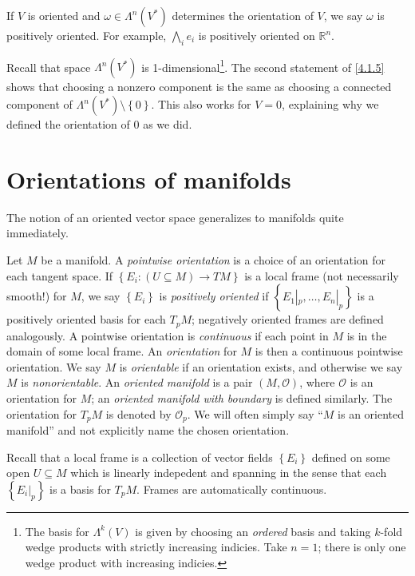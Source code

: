 If $V$ is oriented and $\omega \in \Lambda ^n(V^*)$ determines the orientation of $V$, we say $\omega $ is positively oriented. For example, $\bigwedge_i e_i$ is positively oriented on $\mathbb{R} ^n$.

Recall that space $\Lambda ^n(V^*)$ is 1-dimensional\footnote{The basis for $\Lambda ^k(V)$ is given by choosing an \emph{ordered} basis and taking $k$-fold wedge products with strictly increasing indicies. Take $n=1$; there is only one wedge product with increasing indicies.}. The second statement of \cref{4.1.5} shows that choosing a nonzero component is the same as choosing a connected component of $\Lambda ^n(V^*)\setminus \left\{ 0 \right\} $. This also works for $V=0$, explaining why we defined the orientation of 0 as we did.

\section{Orientations of manifolds}

The notion of an oriented vector space generalizes to manifolds quite immediately.

\begin{definition}\label{4.2.1}
	Let $M$ be a manifold. A \emph{pointwise orientation} is a choice of an orientation for each tangent space. If $\left\{ E_i : (U\subseteq M) \to TM \right\} $ is a local frame (not necessarily smooth!) for $M$, we say $\left\{ E_i \right\} $ is \emph{positively oriented} if $\left\{ E_1|_p, \ldots ,E_n|_p \right\} $ is a positively oriented basis for each $T_pM$; negatively oriented frames are defined analogously. A pointwise orientation is \emph{continuous} if each point in $M$ is in the domain of some local frame. An \emph{orientation} for $M$ is then a continuous pointwise orientation. We say $M$ is \emph{orientable} if an orientation exists, and otherwise we say $M$ is \emph{nonorientable}. An \emph{oriented manifold} is a pair $(M,\mathcal{O} )$, where $\mathcal{O} $ is an orientation for $M$; an \emph{oriented manifold with boundary} is defined similarly. The orientation for $T_pM$ is denoted by $\mathcal{O} _p$. We will often simply say ``$M$ is an oriented manifold'' and not explicitly name the chosen orientation.
\end{definition}

Recall that a local frame is a collection of vector fields $\left\{ E_i \right\} $ defined on some open $U\subseteq M$ which is linearly indepedent and spanning in the sense that each $\left\{ E_i|_p \right\} $ is a basis for $T_pM$. Frames are automatically continuous.

